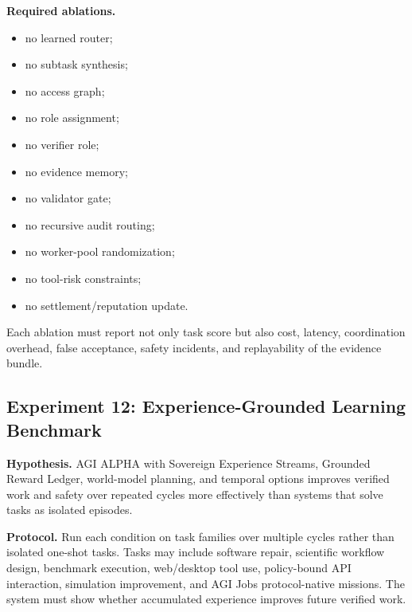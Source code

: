 \documentclass[11pt]{article}
\providecommand{\tightlist}{\setlength{\itemsep}{0pt}\setlength{\parskip}{0pt}}
\begin{document}
\textbf{Required ablations.}

\begin{itemize}
\tightlist
\item
  no learned router;
\item
  no subtask synthesis;
\item
  no access graph;
\item
  no role assignment;
\item
  no verifier role;
\item
  no evidence memory;
\item
  no validator gate;
\item
  no recursive audit routing;
\item
  no worker-pool randomization;
\item
  no tool-risk constraints;
\item
  no settlement/reputation update.
\end{itemize}

Each ablation must report not only task score but also cost, latency, coordination overhead, false acceptance, safety incidents, and replayability of the evidence bundle.

\subsection{Experiment 12: Experience-Grounded Learning Benchmark}\label{experiment-12-experience-grounded-learning-benchmark}

\textbf{Hypothesis.} AGI ALPHA with Sovereign Experience Streams, Grounded Reward Ledger, world-model planning, and temporal options improves verified work and safety over repeated cycles more effectively than systems that solve tasks as isolated episodes.

\textbf{Protocol.} Run each condition on task families over multiple cycles rather than isolated one-shot tasks. Tasks may include software repair, scientific workflow design, benchmark execution, web/desktop tool use, policy-bound API interaction, simulation improvement, and AGI Jobs protocol-native missions. The system must show whether accumulated experience improves future verified work.
\end{document}
